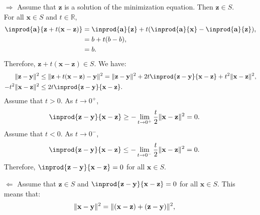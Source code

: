 \documentclass{huhtakm-template-book-v2}
\begin{document}
    \begin{proofing}
        \begin{itemize}
            \item[$\Longrightarrow$] Assume that $\mathbf{z}$ is a solution of the minimization equation. Then $\mathbf{z} \in S$. For all $\mathbf{x} \in S$ and $t \in \mathbb{R}$,
            \begin{align*}
                \inprod{\mathbf{a}}{\mathbf{z}+t(\mathbf{x}-\mathbf{z})} &= \inprod{\mathbf{a}}{\mathbf{z}} + t(\inprod{\mathbf{a}}{\mathbf{x}} - \inprod{\mathbf{a}}{\mathbf{z}}),\\
                &= b + t(b-b),\\
                &= b.
            \end{align*}
            Therefore, $\mathbf{z} + t(\mathbf{x}-\mathbf{z}) \in S$. We have:
            \begin{align*}
                \norm{\mathbf{z}-\mathbf{y}}^{2} &\leq \norm{\mathbf{z}+t(\mathbf{x}-\mathbf{z})-\mathbf{y}}^{2} = \norm{\mathbf{z}-\mathbf{y}}^{2} + 2t\inprod{\mathbf{z}-\mathbf{y}}{\mathbf{x}-\mathbf{z}} + t^{2}\norm{\mathbf{x}-\mathbf{z}}^{2},\\
                -t^{2}\norm{\mathbf{x}-\mathbf{z}}^{2} &\leq 2t\inprod{\mathbf{z}-\mathbf{y}}{\mathbf{x}-\mathbf{z}}.
            \end{align*}
            Assume that $t>0$. As $t \to 0^{+}$,
            \begin{equation*}
                \inprod{\mathbf{z}-\mathbf{y}}{\mathbf{x}-\mathbf{z}} \geq -\lim_{t \to 0^{+}}\frac{t}{2}\norm{\mathbf{x}-\mathbf{z}}^{2} = 0.
            \end{equation*}
            Assume that $t<0$. As $t \to 0^{-}$,
            \begin{equation*}
                \inprod{\mathbf{z}-\mathbf{y}}{\mathbf{x}-\mathbf{z}} \leq -\lim_{t \to 0^{-}}\frac{t}{2}\norm{\mathbf{x}-\mathbf{z}}^{2} = 0.
            \end{equation*}
            Therefore, $\inprod{\mathbf{z}-\mathbf{y}}{\mathbf{x}-\mathbf{z}} = 0$ for all $\mathbf{x} \in S$.
            \item[$\Longleftarrow$] Assume that $\mathbf{z} \in S$ and $\inprod{\mathbf{z}-\mathbf{y}}{\mathbf{x}-\mathbf{z}} = 0$ for all $\mathbf{x} \in S$. This means that:
            \begin{align*}
                \norm{\mathbf{x}-\mathbf{y}}^{2} &= \norm{(\mathbf{x}-\mathbf{z}) + (\mathbf{z}-\mathbf{y})}^{2},\\

\end{align*}
\end{itemize}
\end{proofing}
\end{document}
